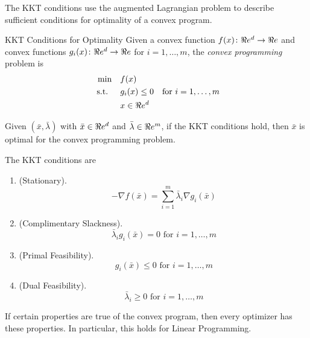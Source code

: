 The KKT conditions use the augmented Lagrangian problem to describe sufficient conditions for optimality of a convex program.  


\begin{general}{KKT Conditions for Optimality}{}
Given a convex function $f(x)\colon \Re e^d \to \Re e$ and convex functions $g_i(x)\colon \Re e^d \to \Re e$ for $i=1, \dots, m$,  the \emph{convex programming} problem is
\begin{equation}
\label{eq:convex-programming-KKT}
\begin{aligned}
\min \quad & f(x)\\
\mbox{ s.t. } \quad  & g_i(x) \leq 0 & \mbox{for } i=1, \dots, m\\
& x \in \Re e^d
\end{aligned}
\end{equation}

Given $(\bar x, \bar \lambda)$ with $\bar x \in \Re e^d$ and $\bar \lambda \in \Re e^m$, if the KKT conditions hold, then $\bar x$ is optimal for the convex programming problem.  

The KKT conditions are
\begin{enumerate}
\item (Stationary).   
\begin{equation}
- \nabla f(\bar x) = \sum_{i=1}^m \bar \lambda_i \nabla g_i(\bar x)
\end{equation}
\item (Complimentary Slackness).   
\begin{equation}
 \bar \lambda_i  g_i(\bar x) = 0 \text{ for } i=1, \dots, m
\end{equation}
\item (Primal Feasibility).   
\begin{equation}
  g_i(\bar x) \leq 0 \text{ for } i=1, \dots, m
\end{equation}
\item (Dual Feasibility).   
\begin{equation}
 \bar \lambda_i \geq 0 \text{ for } i=1, \dots, m
\end{equation}
\end{enumerate}
\end{general}

If certain properties are true of the convex program, then every optimizer has these properties.   In particular, this holds for Linear Programming.


\par{}\label{fig:kkt-optimal}%


